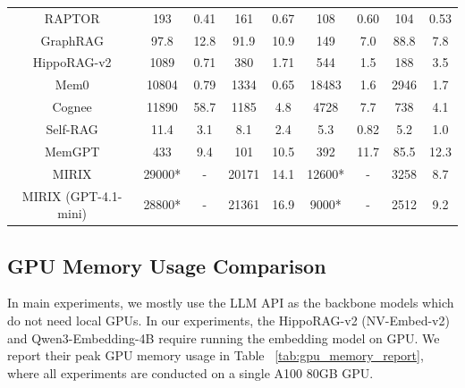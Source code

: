 \begin{table}[t]
{\begin{tabular}{c|cccc|cccc}
          \midrule
          RAPTOR              & 193 & 0.41 & 161 & 0.67 & 108 & 0.60 & 104 & 0.53     \\
          GraphRAG            & 97.8 & 12.8 & 91.9 & 10.9 & 149 & 7.0 & 88.8 & 7.8    \\
          HippoRAG-v2         & 1089  & 0.71 & 380  & 1.71 & 544 & 1.5  & 188 & 3.5         \\
          Mem0                & 10804 & 0.79 & 1334 & 0.65 & 18483 & 1.6 & 2946 & 1.7 \\
          Cognee              & 11890 & 58.7 & 1185 & 4.8 & 4728 & 7.7 & 738 & 4.1     \\

          \midrule
          Self-RAG            & 11.4 & 3.1 & 8.1 & 2.4 & 5.3 & 0.82 & 5.2 & 1.0    \\
          MemGPT              & 433 & 9.4 & 101 & 10.5 & 392 & 11.7 & 85.5 & 12.3  \\
          MIRIX    & 29000* & - & 20171 & 14.1 & 12600* & - & 3258  & 8.7  \\
          MIRIX (GPT-4.1-mini) & 28800* & - & 21361 & 16.9 & 9000* & - & 2512 & 9.2 \\ 
          \bottomrule
        \end{tabular}
        }
    \label{tab:computation_latency_rag}
    \centering
\end{table}




\subsection{GPU Memory Usage Comparison}
\label{sub:gpu_memory_usage_comparison}
In main experiments, we mostly use the LLM API as the backbone models which do not need local GPUs. In our experiments, the HippoRAG-v2 (NV-Embed-v2) and Qwen3-Embedding-4B require running the embedding model on GPU. We report their peak GPU memory usage in Table ~\ref{tab:gpu_memory_report}, where all experiments are conducted on a single A100 80GB GPU.


\begin{table}
    \centering
    \caption{Peak GPU memory usage of embedding models (MB). We measure the memory usage on MH-QA dataset with different chunk size.}
\label{tab:gpu_memory_report}
\end{table}




